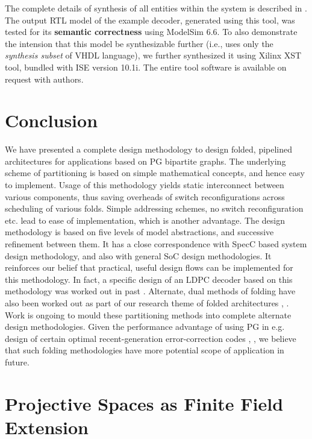 \documentclass[12pt]{article}
\begin{document}
The complete details of synthesis of all entities within the
system is described in \cite{utk_rep}. The output RTL model of the example
decoder, generated using this tool, was tested for its \textbf{semantic
correctness} using ModelSim 6.6. To also demonstrate the intension that
this model be synthesizable further (i.e., uses only the \textit{synthesis
subset} of VHDL language), we further synthesized it using Xilinx XST tool,
bundled with ISE version 10.1i. The entire tool software is available on
request with authors.


\section{Conclusion}
We have presented a complete design methodology to design folded, pipelined
architectures for applications based on PG bipartite graphs. The underlying
scheme of partitioning is based on simple mathematical concepts, and hence
easy to implement. Usage of this methodology yields static interconnect between
various components, thus saving overheads of switch reconfigurations across
scheduling of various folds. Simple addressing schemes, no switch
reconfiguration etc. lead to ease of implementation, which is another
advantage. The design methodology is based on five levels of model
abstractions, and successive refinement between them. It has a close
correspondence with SpecC based system design methodology, and also
with general SoC design methodologies. It reinforces our belief that
practical, useful design flows can be implemented for this methodology. In
fact, a specific design of an LDPC decoder based on this methodology
was worked out in past \cite{ldpc_foldpat}. Alternate, dual methods of
folding have also been worked out as part of our research theme of folded
architectures \cite{cacs_pap}, \cite{expanders}. Work is ongoing to mould
these partitioning methods into complete alternate design methodologies. Given
the performance advantage of using PG in e.g. design of certain optimal
recent-generation error-correction codes \cite{expanders},
\cite{ldpc_pap}, we believe that such folding methodologies have more
potential scope of application in future.



\appendix
\section{Projective Spaces as Finite Field Extension}
\label{appA}
\end{document}
